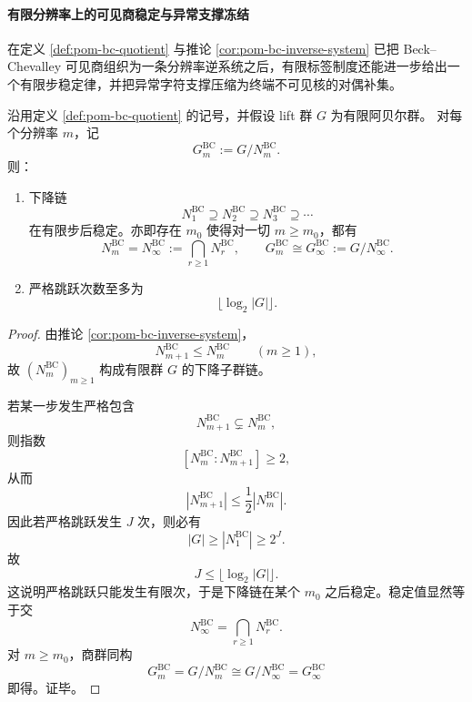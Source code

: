 \paragraph{有限分辨率上的可见商稳定与异常支撑冻结}
在定义 \ref{def:pom-bc-quotient} 与推论 \ref{cor:pom-bc-inverse-system} 已把
Beck--Chevalley 可见商组织为一条分辨率逆系统之后，有限标签制度还能进一步给出一个有限步稳定律，并把异常字符支撑压缩为终端不可见核的对偶补集。

\begin{theorem}\label{thm:pom-bc-visible-quotient-eventual-stability}
沿用定义 \ref{def:pom-bc-quotient} 的记号，并假设 lift 群 \(G\) 为有限阿贝尔群。
对每个分辨率 \(m\)，记
\[
G_m^{\mathrm{BC}}:=G/N_m^{\mathrm{BC}}.
\]
则：
\begin{enumerate}
  \item 下降链
  \[
  N_1^{\mathrm{BC}}\supseteq N_2^{\mathrm{BC}}\supseteq N_3^{\mathrm{BC}}\supseteq\cdots
  \]
  在有限步后稳定。亦即存在 \(m_0\) 使得对一切 \(m\ge m_0\)，都有
  \[
  N_m^{\mathrm{BC}}=N_\infty^{\mathrm{BC}}
  :=\bigcap_{r\ge 1}N_r^{\mathrm{BC}},
  \qquad
  G_m^{\mathrm{BC}}\cong G_\infty^{\mathrm{BC}}
  :=G/N_\infty^{\mathrm{BC}}.
  \]
  \item 严格跳跃次数至多为
  \[
  \lfloor \log_2|G|\rfloor.
  \]
\end{enumerate}
\end{theorem}
\begin{proof}
由推论 \ref{cor:pom-bc-inverse-system}，
\[
N_{m+1}^{\mathrm{BC}}\le N_m^{\mathrm{BC}}
\qquad(m\ge 1),
\]
故 \((N_m^{\mathrm{BC}})_{m\ge 1}\) 构成有限群 \(G\) 的下降子群链。

若某一步发生严格包含
\[
N_{m+1}^{\mathrm{BC}}\subsetneq N_m^{\mathrm{BC}},
\]
则指数
\[
[N_m^{\mathrm{BC}}:N_{m+1}^{\mathrm{BC}}]\ge 2,
\]
从而
\[
|N_{m+1}^{\mathrm{BC}}|
\le \frac{1}{2}|N_m^{\mathrm{BC}}|.
\]
因此若严格跳跃发生 \(J\) 次，则必有
\[
|G|\ge |N_1^{\mathrm{BC}}|\ge 2^J.
\]
故
\[
J\le \lfloor \log_2|G|\rfloor.
\]
这说明严格跳跃只能发生有限次，于是下降链在某个 \(m_0\) 之后稳定。稳定值显然等于交
\[
N_\infty^{\mathrm{BC}}=\bigcap_{r\ge 1}N_r^{\mathrm{BC}}.
\]
对 \(m\ge m_0\)，商群同构
\[
G_m^{\mathrm{BC}}=G/N_m^{\mathrm{BC}}\cong G/N_\infty^{\mathrm{BC}}=G_\infty^{\mathrm{BC}}
\]
即得。证毕。
\end{proof}

